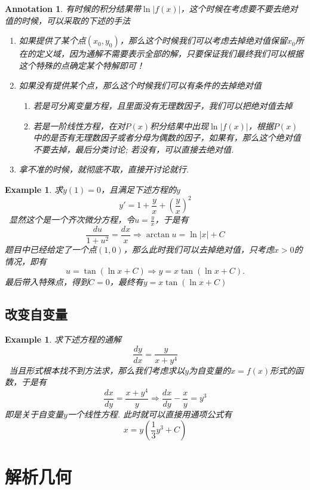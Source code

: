 \documentclass{article}
\newtheorem{example}[theorem]{Example}
\newtheorem{annotation}[theorem]{Annotation}
\newcommand{\hints}{{\color{blue} \text{hints}}}
\begin{document}
\begin{annotation}
\rm 有时候的积分结果带$\ln|f(x)|$，这个时候在考虑要不要去绝对值的时候，可以采取的下述的手法
\begin{enumerate}
	\item 如果提供了某个点$(x_0,y_0)$，那么这个时候我们可以考虑去掉绝对值保留$x_0$所在的定义域，因为通解不需要表示全部的解，只要保证我们最终我们可以根据这个特殊的点确定某个特解即可！
	\item 如果没有提供某个点，那么这个时候我们可以有条件的去掉绝对值
	\begin{enumerate}
		\item 若是可分离变量方程，且里面没有无理数因子，我们可以把绝对值去掉
		\item 若是一阶线性方程，在对$P(x)$积分结果中出现$\ln|f(x)|$，根据$P(x)$中的是否有无理数因子或者分母为偶数的因子，如果有，那么这个绝对值不要去掉，最后分类讨论; 若没有，可以直接去绝对值. 
	\end{enumerate}
	\item 拿不准的时候，就彻底不取，直接开讨论就行. 
\end{enumerate}	
\end{annotation}

\begin{example}
\rm 求$y(1)=0$，且满足下述方程的$y$
$$
y'  = 1+\frac{y}{x} + \left( \frac{y}{x} \right)^2
$$
\hints\ 显然这个是一个齐次微分方程，令$u = \frac{y}{x}$，于是有
$$
\frac{du}{1+u^2} = \frac{dx}{x} \Rightarrow \arctan u = \ln |x|+C
$$
题目中已经给定了一个点$(1,0)$，那么此时我们可以去掉绝对值，只考虑$x > 0$的情况，即有
$$
u = \tan (\ln x + C) \Rightarrow y = x\tan (\ln x + C).
$$
最后带入特殊点，得到$C = 0$，最终有$y = x\tan (\ln x + C)$
\end{example}


\subsection{改变自变量}

\begin{example}
\rm 求下述方程的通解
$$
\frac{dy}{dx} = \frac{y}{x+y^4}
$$
\hints\ 当且形式根本找不到方法求，那么我们考虑求以$y$为自变量的$x=f(x)$形式的函数，于是有
$$
\frac{dx}{dy} = \frac{x+y^4}{y}  \Rightarrow \frac{dx}{dy} - \frac{x}{y} = y^3
$$
即是关于自变量$y$一个线性方程. 此时就可以直接用通项公式有
$$
x= y(\frac{1}{3}y^3 + C)
$$
\end{example}

\newpage
\section{解析几何}
\end{document}
